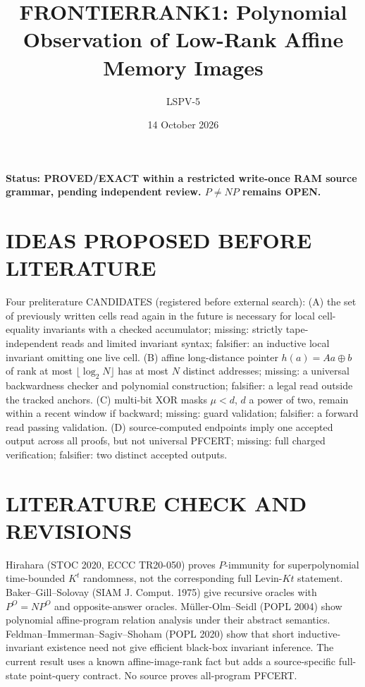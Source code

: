 \documentclass[11pt]{article}
\title{FRONTIERRANK1: Polynomial Observation of Low-Rank Affine Memory Images}
\author{LSPV-5}
\date{14 October 2026}
\begin{document}
\maketitle
\noindent\textbf{Status: PROVED/EXACT within a restricted write-once RAM source grammar, pending independent review. $P\ne NP$ remains OPEN.}
\section{IDEAS PROPOSED BEFORE LITERATURE}
Four preliterature CANDIDATES (registered before external search): (A) the set of previously written cells read again in the future is necessary for local cell-equality invariants with a checked accumulator; missing: strictly tape-independent reads and limited invariant syntax; falsifier: an inductive local invariant omitting one live cell. (B) affine long-distance pointer $h(a)=Aa\oplus b$ of rank at most $\lfloor\log_2N\rfloor$ has at most $N$ distinct addresses; missing: a universal backwardness checker and polynomial construction; falsifier: a legal read outside the tracked anchors. (C) multi-bit XOR masks $\mu<d$, $d$ a power of two, remain within a recent window if backward; missing: guard validation; falsifier: a forward read passing validation. (D) source-computed endpoints imply one accepted output across all proofs, but not universal PFCERT; missing: full charged verification; falsifier: two distinct accepted outputs.
\section{LITERATURE CHECK AND REVISIONS}
Hirahara (STOC 2020, ECCC TR20-050) proves $P$-immunity for superpolynomial time-bounded $K^t$ randomness, not the corresponding full Levin-$Kt$ statement. Baker--Gill--Solovay (SIAM J. Comput. 1975) give recursive oracles with $P^O=NP^O$ and opposite-answer oracles. M\"uller-Olm--Seidl (POPL 2004) show polynomial affine-program relation analysis under their abstract semantics. Feldman--Immerman--Sagiv--Shoham (POPL 2020) show that short inductive-invariant existence need not give efficient black-box invariant inference. The current result uses a known affine-image-rank fact but adds a source-specific full-state point-query contract. No source proves all-program PFCERT.
\end{document}
